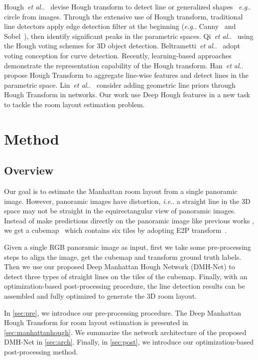\documentclass[runningheads]{llncs}
\makeatletter
\DeclareRobustCommand\onedot{\futurelet\@let@token\@onedot}
\def\@onedot{\ifx\@let@token.\else.\null\fi\xspace}
\def\eg{\emph{e.g}\onedot} \def\Eg{\emph{E.g}\onedot}
\def\ie{\emph{i.e}\onedot} \def\Ie{\emph{I.e}\onedot}
\def\etal{\emph{et al}\onedot}
\makeatother
\begin{document}
 Hough~\etal~\cite{hough1962method} devise Hough transform to detect line or generalized shapes~\cite{ballard1981generalizing} \eg circle from images. Through the extensive use of Hough transform, traditional line detectors apply edge detection filter at the beginning (\eg Canny~\cite{canny1986computational} and Sobel~\cite{sobel19683x3}), then identify signiﬁcant peaks in the parametric spaces. Qi~\etal~\cite{qi2019deep} using the Hough voting schemes for 3D object detection. Beltrametti~\etal~\cite{beltrametti2020geometry} adopt voting conception for curve detection.
Recently, learning-based approaches demonstrate the representation capability of the Hough transform. Han~\etal~\cite{han2020deep} propose Hough Transform to aggregate line-wise features and detect lines in the parametric space. Lin~\etal~\cite{lin2020deep} consider adding geometric line priors through Hough Transform in networks. Our work use Deep Hough features in a new task to tackle the room layout estimation problem. \section{Method}
\subsection{Overview}

Our goal is to estimate the Manhattan room layout from a single  panoramic image. However, panoramic images have distortion, \ie a straight line in the 3D space may not be straight in the equirectangular view of panoramic images. Instead of make predictions directly on the panoramic image like previous works \cite{zou2018layoutnet,sun2019horizonnet,Wang_2021_LED2Net,Sun_2021_HoHoNet}, we get a cubemap~\cite{ng2005data} which contains six tiles by adopting E2P transform~\cite{ng2005data,yang2019dula}.

Given a single RGB panoramic image as input, first we take some pre-processing steps to align the image, get the cubemap and transform ground truth labels.
Then we use our proposed Deep Manhattan Hough Network (DMH-Net) to detect three types of straight lines on the tiles of the cubemap. 
Finally, with an optimization-based post-processing procedure, the line detection results can be assembled and fully optimized to generate the 3D room layout.

In \cref{sec:pre}, we introduce our pre-processing procedure.
The Deep Manhattan Hough Transform for room layout estimation is presented in \cref{sec:manhattanhough}.
We summarize the network architecture of the proposed DMH-Net in \cref{sec:arch}.
Finally, in \cref{sec:post}, we introduce our optimization-based post-processing method.
\end{document}
